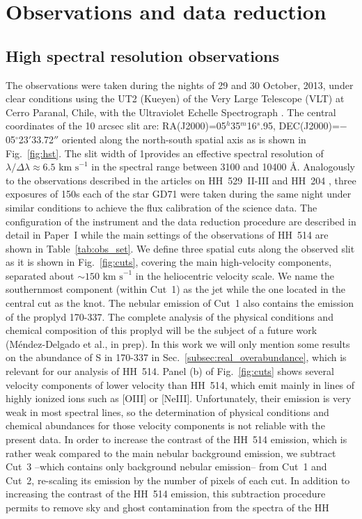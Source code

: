 \documentclass[fleqn,usenatbib]{mnras}
\begin{document}
\section{Observations and data reduction}
\label{sec:data}

\subsection{High spectral resolution observations}
\label{sec:data_uves}

The observations were taken during the nights of 29 and 30 October, 2013, under clear conditions using the UT2 (Kueyen) of the Very Large Telescope (VLT) at Cerro Paranal, Chile, with the Ultraviolet Echelle Spectrograph \citep[UVES;][]{Dodorico00}. The central coordinates of the 10 arcsec slit are: RA(J2000)=05$^h$35$^m$16$^s$.95, DEC(J2000)=$-$05$^{\circ}$23$'$33.72$''$ oriented along the north-south spatial axis as is shown in Fig.~\ref{fig:hst}. The slit width of 1\arcsec provides an effective spectral resolution of $\lambda/\Delta \lambda \approx 6.5 \text{ km s}^{-1}$ in the spectral range between 3100 and 10400 \AA. Analogously to the observations described in the articles on HH~529~II-III and HH~204 \citep[][hereinafter Paper~I and Paper~II, respectively]{mendez2021,mendez2021-2}, three exposures of 150s each of the star GD71 \citep{Moehler14a, Moehler14b} were taken during the same night under similar conditions to achieve the flux calibration of the science data. The configuration of the instrument and the data reduction procedure are described in detail in Paper~I while the main settings of the observations of HH~514 are shown in Table~\ref{tab:obs_set}. We define three spatial cuts along the observed slit as it is shown in Fig.~\ref{fig:cuts}, covering the main high-velocity components, separated about $\sim 150\text{ km s}^{-1}$ in the heliocentric velocity scale. We name the southernmost component (within Cut~1) as the jet while the one located in the central cut as the knot. The nebular emission of Cut~1 also contains the emission of the proplyd 170-337. The complete analysis of the physical conditions and chemical composition of this proplyd will be the subject of a future work (M\'endez-Delgado et al., in prep). In this work we will only mention some results on the abundance of S in 170-337 in Sec.~\ref{subsec:real_overabundance}, which is relevant for our analysis of HH~514. Panel (b) of Fig.~\ref{fig:cuts} shows several velocity components of lower velocity than HH~514, which emit mainly in lines of highly ionized ions such as [O\thinspace III] or [Ne\thinspace III]. Unfortunately, their emission is very weak in most spectral lines, so the determination of physical conditions and chemical abundances for those velocity components is  not reliable with the present data. In order to increase the contrast of the HH~514 emission, which is rather weak compared to the main nebular background emission, we subtract Cut~3 --which contains only background nebular emission-- from Cut~1 and Cut~2, re-scaling its emission by the number of pixels of each cut. In addition to increasing the contrast of the HH~514 emission, this subtraction procedure permits to remove sky and ghost contamination from the spectra of the HH 
\end{document}
